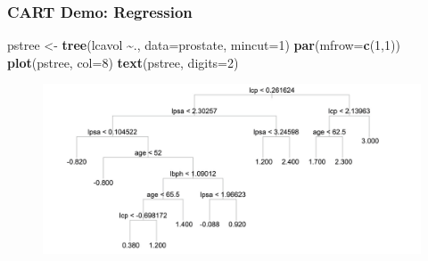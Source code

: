 \documentclass[
  shownotes,
  xcolor={svgnames},
  hyperref={colorlinks,citecolor=DarkBlue,linkcolor=DarkRed,urlcolor=DarkBlue}
  , aspectratio=169]{beamer}
\newenvironment{Shaded}{\begin{snugshade}}{\end{snugshade}}
\newcommand{\DataTypeTok}[1]{\textcolor[rgb]{0.13,0.29,0.53}{#1}}
\newcommand{\DecValTok}[1]{\textcolor[rgb]{0.00,0.00,0.81}{#1}}
\newcommand{\KeywordTok}[1]{\textcolor[rgb]{0.13,0.29,0.53}{\textbf{#1}}}
\newcommand{\NormalTok}[1]{#1}
\newcommand{\OperatorTok}[1]{\textcolor[rgb]{0.81,0.36,0.00}{\textbf{#1}}}
\newcommand{\StringTok}[1]{\textcolor[rgb]{0.31,0.60,0.02}{#1}}
\begin{document}
\begin{frame}[fragile]
\frametitle{CART Demo: Regression}

\begin{scriptsize}
\begin{Shaded}
\begin{Highlighting}[]
\NormalTok{pstree \textless{}{-}}\StringTok{ }\KeywordTok{tree}\NormalTok{(lcavol }\OperatorTok{\textasciitilde{}}\NormalTok{., }\DataTypeTok{data=}\NormalTok{prostate, }\DataTypeTok{mincut=}\DecValTok{1}\NormalTok{)}
\KeywordTok{par}\NormalTok{(}\DataTypeTok{mfrow=}\KeywordTok{c}\NormalTok{(}\DecValTok{1}\NormalTok{,}\DecValTok{1}\NormalTok{))}
\KeywordTok{plot}\NormalTok{(pstree, }\DataTypeTok{col=}\DecValTok{8}\NormalTok{)}
\KeywordTok{text}\NormalTok{(pstree, }\DataTypeTok{digits=}\DecValTok{2}\NormalTok{)}
\end{Highlighting}
\end{Shaded}
\end{scriptsize}


\begin{figure}[H] \centering
            \captionsetup{justification=centering}
              \includegraphics[scale=0.15]{figures/tree_cancer}
 \end{figure}
\end{frame}
\end{document}
